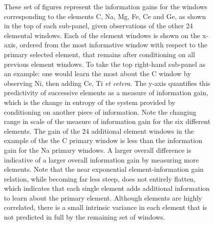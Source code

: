 \documentclass[a4paper,fleqn,usenatbib]{mnras}
\begin{document}
\begin{figure}
    \caption{These set of figures represent the information gains for the windows corresponding to the elements C, Na, Mg, Fe, Ce and Ge, as shown in the top of each sub-panel, given observations of the other 24 elemental windows. Each of the element windows is shown on the x-axis, ordered from the most informative window with respect to the primary selected element, that remains after conditioning on all previous element windows. To take the top right-hand sub-panel as an example: one would learn the most about the C window by observing Ni, then adding Ce, Ti {\it et cetera}. The y-axis quantifies this predictivity of successive elements as a measure of information gain, which is the change in entropy of the system provided by conditioning on another piece of information. Note the changing range in scale of the measure of information gain for the six different elements. The gain of the 24 additional element windows in the example of the the C primary window is less than the information gain for the Na primary windows. A larger overall difference is indicative of a larger overall information gain by measuring more elements. Note that the near exponential element-information gain relation, while becoming far less steep, does not entirely flatten, which indicates that each single element adds additional information to learn about the primary element. Although elements are highly correlated, there is a small intrinsic variance in each element that is not predicted in full by the remaining set of windows. }
    \label{fig:single_element_information}
\end{figure}

\end{document}
